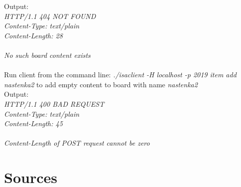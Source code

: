 \documentclass[11pt, a4paper]{article}
\begin{document}
	Output: \\
	\textit{HTTP/1.1 404 NOT FOUND \\ Content-Type: text/plain \\ Content-Length: 28 \\ \\ No such board content exists \\}
	\\Run client from the command line: \textit{./isaclient -H localhost -p 2019 item add nastenka2 } to add empty content to board with name \textit{nastenka2} \\
	Output: \\
	\textit{HTTP/1.1 400 BAD REQUEST \\ Content-Type: text/plain \\ Content-Length: 45 \\ \\ Content-Length of POST request cannot be zero \\}
	
	\newpage
	\section{Sources}	
	
	\renewcommand{\refname}{}
		
\end{document}
